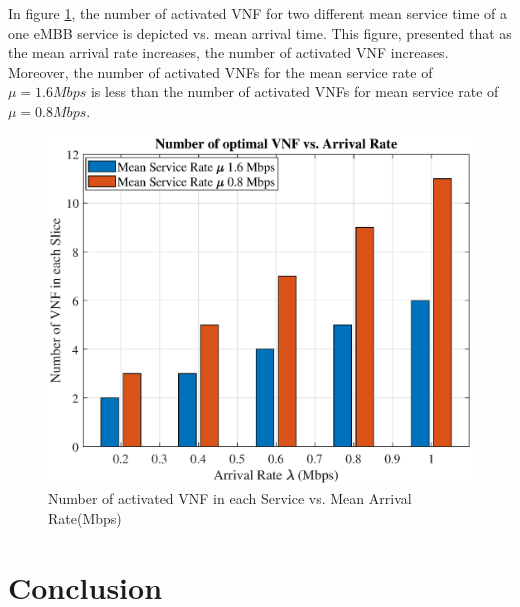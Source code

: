 \documentclass[conference]{IEEEtran}
\begin{document}
In figure \ref{fig:4}, the number of activated VNF for two different mean service time of a one eMBB service is depicted vs. mean arrival time. This figure, presented that as the mean arrival rate increases, the number of activated VNF increases. Moreover, the number of activated VNFs for the mean service rate of $\mu = 1.6Mbps$ is less than the number of activated VNFs for mean service rate of $\mu  =  0.8Mbps$.


\begin{figure}
  \centering 
    \includegraphics[scale = 0.4]{vnfNum.eps}
  \caption{Number of activated VNF in each Service vs. Mean Arrival Rate(Mbps)}
  \label{fig:4}
\end{figure}




\section{Conclusion}\label{conc}


\end{document}
